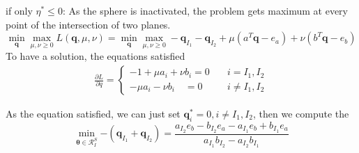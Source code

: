 \documentclass[twoside]{article}
\theoremstyle{plain}
\renewcommand{\vec}[1]{\bm{#1}}
\begin{document}
if only $\eta^{*} \leq 0$:
As the sphere is inactivated, the problem gets maximum at every point of the intersection of two planes.
\begin{equation}
\min_{\vec{q}} \max_{\mu,\nu \geq 0} L(\vec{q},\mu,\nu) =\min_{\vec{q}}\max_{\mu,\nu\geq0} - {\vec{q}_{I_1} - \vec{q}_{I_2} +\mu( a^T\vec{q} - e_a ) + \nu( b^T\vec{q} - e_b )}
\end{equation}
To have a solution, the equations satisfied
 \begin{equation}
\begin{split} 
\frac{\partial L}{\partial q} = \left\{
\begin{aligned}
-1+\mu a_i + \nu b_i =0 \quad& i = I_1, I_2\\
-\mu a_i -\nu b_i \quad =0& i \neq I_1, I_2
\end{aligned}
\right.
 \end{split}
\end{equation}

As the equation satisfied, we can just set $\vec{q}_i^{*} = 0, i \neq I_1,I_2$, then we compute the  
 \begin{equation}
 \min_{\vec{\theta} \in \mathcal{R}^{S}_{I}}{- ( \vec{q}_{I_1} +\vec{q}_{I_2} )} = \frac{a_{I_2}e_b - b_{I_2}e_a -a_{I_1}e_b +b_{I_1}e_a}{a_{I_1}b_{I_2}-a_{I_2}b_{I_1}}
\end{equation}
\end{document}
